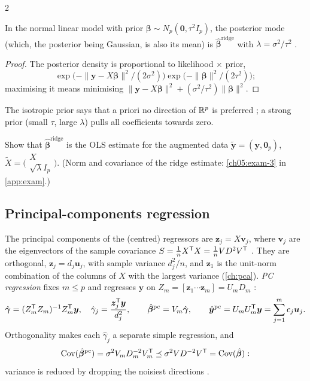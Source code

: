 \begin{paracol}{2}
\begin{proposition}\label{ch05:prop-ridgebayes}
In the normal linear model with prior $\bm\beta\sim N_p(\bm 0,\tau^2I_p)$, the posterior mode (which, the posterior being Gaussian,
is also its mean) is $\hat{\bm\beta}^{\text{ridge}}$ with $\lambda=\sigma^2/\tau^2$ .
\end{proposition}
\begin{proof}
The posterior density is proportional to likelihood $\times$ prior,
\[\exp\bigl(-\|\bm y-X\bm\beta\|^2/(2\sigma^2)\bigr)\exp\bigl(-\|\bm\beta\|^2/(2\tau^2)\bigr);\]
maximising it means minimising $\|\bm y-X\bm\beta\|^2+(\sigma^2/\tau^2)\|\bm\beta\|^2$.
\end{proof}
The isotropic prior says that a priori no direction of $\mathbb{R}^p$ is preferred ; a strong prior (small
$\tau$, large $\lambda$) pulls all coefficients towards zero.

\begin{exercise}\label{ch05:exam-3-short}
Show that $\hat{\bm\beta}^{\text{ridge}}$ is the OLS estimate for the augmented data $\tilde{\bm y}=(\bm y,\bm 0_p)$, $\tilde X=\bigl(\begin{smallmatrix}X\\ \sqrt\lambda I_p\end{smallmatrix}\bigr)$. (Norm and covariance of the ridge estimate: \cref{ch05:exam-3} in \cref{app:exam}.)
\end{exercise}

\subsection{Principal-components regression}
The principal components of the (centred) regressors are $\bm z_j=X\bm v_j$, where $\bm v_j$ are the eigenvectors of the
sample covariance $S=\frac1nX^{\mathsf T} X=\frac1nVD^2V^{\mathsf T}$ . They are orthogonal, $\bm z_j=d_j\bm u_j$, with sample
variance $d_j^2/n$, and $\bm z_1$ is the unit-norm combination of the columns of $X$ with the largest variance
(\cref{ch:pca}). \emph{PC regression} fixes $m\le p$ and regresses $\bm y$ on $Z_m=[\bm z_1\cdots\bm z_m]=U_mD_m$
:
\[
  \hat{\bm\gamma}=(Z_m^{\mathsf T} Z_m)^{-1}Z_m^{\mathsf T}\bm y,\quad \hat\gamma_j=\frac{\bm z_j^{\mathsf T}\bm y}{d_j^2},\qquad
  \hat{\bm\beta}^{\text{pc}}=V_m\hat{\bm\gamma},\qquad \hat{\bm y}^{\text{pc}}=U_mU_m^{\mathsf T}\bm y=\sum_{j=1}^mc_j\bm u_j .
\]
Orthogonality makes each $\hat\gamma_j$ a separate simple regression, and
\[\operatorname{Cov}(\hat{\bm\beta}^{\text{pc}})=\sigma^2V_mD_m^{-2}V_m^{\mathsf T}\preceq\sigma^2VD^{-2}V^{\mathsf T}=\operatorname{Cov}(\hat{\bm\beta}):\]
variance is reduced by dropping the noisiest
directions .


\end{paracol}
